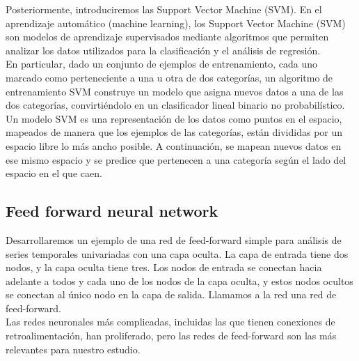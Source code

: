 	Posteriormente, introduciremos las Support Vector Machine (SVM).  En el aprendizaje autom\'atico (machine learning), los Support Vector Machine (SVM) son modelos de aprendizaje supervisados mediante algoritmos que permiten analizar los datos utilizados para la clasificaci\'on y el an\'alisis de regresi\'on.\\
	En particular, dado un conjunto de ejemplos de entrenamiento, cada uno marcado como perteneciente a una u otra de dos categor\'{i}as, un algoritmo de entrenamiento SVM construye un modelo que asigna nuevos datos a una de las dos categor\'{i}as, convirti\'endolo en un clasificador lineal binario no probabil\'{i}stico.\\
	Un modelo SVM es una representaci\'on de los datos como puntos en el espacio, mapeados de manera que los ejemplos de las categor\'{i}as, est\'an divididas por un espacio libre lo m\'as ancho posible. A continuaci\'on, se mapean nuevos datos en ese mismo espacio y se predice que pertenecen a una categor\'{i}a seg\'un el lado del espacio en el que caen.
%	
\subsection{Feed forward neural network}
	Desarrollaremos un ejemplo de una red de feed-forward simple para an\'alisis de series temporales univariadas con una capa oculta. La capa de entrada tiene dos nodos, y la capa oculta tiene tres. Los nodos de entrada se conectan hacia adelante a todos y cada uno de los nodos de la capa oculta, y estos nodos ocultos se conectan al \'unico nodo en la capa de salida. Llamamos a la red una red de feed-forward.\\
	Las redes neuronales m\'as complicadas, incluidas las que tienen conexiones de retroalimentaci\'on, han proliferado, pero las redes de feed-forward son las m\'as relevantes para nuestro estudio.
	
	
